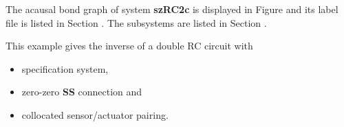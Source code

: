 

   The acausal bond graph of system \textbf{szRC2c} is
   displayed in Figure  and its label
   file is listed in Section .
   The subsystems are listed in Section .


This example gives the inverse of a double RC circuit with
\begin{itemize}
\item specification system,
\item zero-zero \textbf{SS} connection and
\item collocated sensor/actuator pairing.
\end{itemize}

